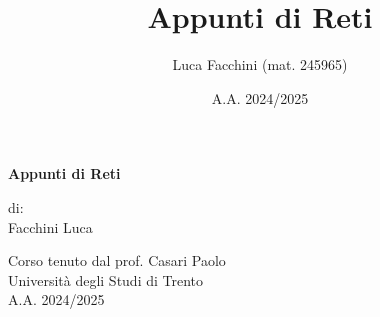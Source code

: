 \documentclass[a4paper,twoside]{report}
\title{Appunti di Reti}
\author{Luca Facchini (mat. 245965)}
\date{A.A. 2024/2025}
\begin{document}
    

    \begin{titlepage}
        \centering  %
        {\Huge\textbf{Appunti di Reti}} \\[1cm] %
        \vspace{1.5cm}
        
        {\normalsize di: } \\[.3cm]
        {\Large Facchini Luca} \\ %
        \vspace{1.5cm}
        

        {\normalsize Corso tenuto dal prof. Casari Paolo} \\[0.3cm] %
        {\large Università degli Studi di Trento} \\[1.5cm]
        
        {\large A.A. 2024/2025} \\[3cm] %
        

\end{titlepage}
\end{document}
